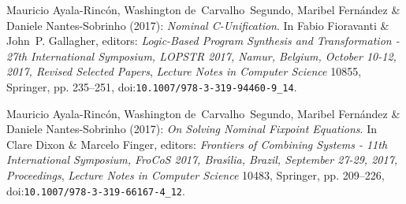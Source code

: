 \documentclass[11pt,a4paper]{amsart}
\theoremstyle{plain}
\theoremstyle{definition}
\theoremstyle{remark}
\begin{document}
    




\begin{thebibliography}{10}
\providecommand{\bibitemdeclare}[2]{}
\providecommand{\surnamestart}{}
\providecommand{\surnameend}{}
\providecommand{\urlprefix}{Available at }
\providecommand{\url}[1]{\texttt{#1}}
\providecommand{\href}[2]{\texttt{#2}}
\providecommand{\urlalt}[2]{\href{#1}{#2}}
\providecommand{\doi}[1]{doi:\urlalt{https://doi.org/#1}{#1}}
\providecommand{\eprint}[1]{arXiv:\urlalt{https://arxiv.org/abs/#1}{#1}}
\providecommand{\bibinfo}[2]{#2}

\bibitemdeclare{inproceedings}{lopstr:NominalC-Unif/Washington17}
\bibinfo{author}{Mauricio \surnamestart Ayala{-}Rinc{\'{o}}n\surnameend},
  \bibinfo{author}{Washington \surnamestart de~Carvalho~Segundo\surnameend},
  \bibinfo{author}{Maribel \surnamestart Fern{\'{a}}ndez\surnameend} \&
  \bibinfo{author}{Daniele \surnamestart Nantes{-}Sobrinho\surnameend}
  (\bibinfo{year}{2017}): \emph{\bibinfo{title}{Nominal C-Unification}}.
\newblock In \bibinfo{editor}{Fabio \surnamestart Fioravanti\surnameend} \&
  \bibinfo{editor}{John~P. \surnamestart Gallagher\surnameend}, editors:
  {\slshape \bibinfo{booktitle}{Logic-Based Program Synthesis and
  Transformation - 27th International Symposium, {LOPSTR} 2017, Namur, Belgium,
  October 10-12, 2017, Revised Selected Papers}}, {\slshape
  \bibinfo{series}{Lecture Notes in Computer Science}} \bibinfo{volume}{10855},
  \bibinfo{publisher}{Springer}, pp. \bibinfo{pages}{235--251},
  \doi{10.1007/978-3-319-94460-9\_14}.

\bibitemdeclare{inproceedings}{OnSolvingNomFPequations/frocos/Washington17}
\bibinfo{author}{Mauricio \surnamestart Ayala{-}Rinc{\'{o}}n\surnameend},
  \bibinfo{author}{Washington \surnamestart de~Carvalho~Segundo\surnameend},
  \bibinfo{author}{Maribel \surnamestart Fern{\'{a}}ndez\surnameend} \&
  \bibinfo{author}{Daniele \surnamestart Nantes{-}Sobrinho\surnameend}
  (\bibinfo{year}{2017}): \emph{\bibinfo{title}{On Solving Nominal Fixpoint
  Equations}}.
\newblock In \bibinfo{editor}{Clare \surnamestart Dixon\surnameend} \&
  \bibinfo{editor}{Marcelo \surnamestart Finger\surnameend}, editors: {\slshape
  \bibinfo{booktitle}{Frontiers of Combining Systems - 11th International
  Symposium, FroCoS 2017, Bras{\'{\i}}lia, Brazil, September 27-29, 2017,
  Proceedings}}, {\slshape \bibinfo{series}{Lecture Notes in Computer Science}}
  \bibinfo{volume}{10483}, \bibinfo{publisher}{Springer}, pp.
  \bibinfo{pages}{209--226},
  \doi{10.1007/978-3-319-66167-4\_12}.


\end{thebibliography}
\end{document}
